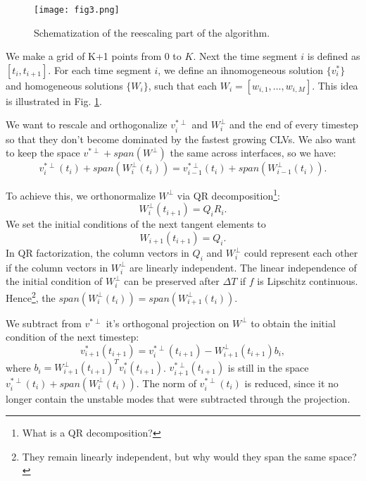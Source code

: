 \documentclass[10pt,twoside,a4paper]{article} %
\begin{document}
\begin{figure} %
  \begin{center}
    \texttt{[image: fig3.png]}
  \end{center}
  \caption{Schematization of the reescaling part of the algorithm.}
  \label{fig:3}
\end{figure}
We make a grid of K+1 points from 0 to $K$. Next the time segment $i$ is defined as $[t_i, t_{i+1}]$. For each time segment $i$, we define an ihnomogeneous solution $\{v_i^*\}$ and homogeneous solutions $\{W_i\}$, such that each $W_i = [w_{i,1},\ldots,w_{i,M}]$. This idea is illustrated in Fig. \ref{fig:3}.

We want to rescale and orthogonalize $v_i^{*\perp}$ and $W_i^\perp$ and the end of every timestep so that they don't become dominated by the fastest growing CLVs. We also want to keep the space $v^{*\perp} + span(W^\perp)$ the same across interfaces, so we have:
\begin{equation}
  v_i^{*\perp}(t_i) + span(W_{i}^\perp(t_i)) = v_{i-1}^{*\perp}(t_i) + span(W_{i-1}^\perp(t_i)).
  \label{eq:16}
\end{equation}

To achieve this, we orthonormalize $W^\perp$ via QR decomposition\footnote{What is a QR decomposition?}:
\begin{equation}
  W_i^\perp(t_{i+1}) = Q_i R_i.
  \label{eq:17}
\end{equation}
We set the initial conditions of the next tangent elements to
\begin{equation}
  W_{i+1}(t_{i+1}) = Q_i.
  \label{eq:18}
\end{equation}
In QR factorization, the column vectors in $Q_i$ and $W_i^\perp$ could represent each other if the column vectors in $W_i^\perp$ are linearly independent. The linear independence of the initial condition of $W_i^\perp$ can be preserved after $\Delta T$ if $f$ is Lipschitz continuous. Hence\footnote{They remain linearly independent, but why would they span the same space?}, the $span(W_i^\perp(t_i)) = span(W_{i+1}^\perp(t_{i}))$.

We subtract from $v^{*\perp}$ it's orthogonal projection on $W^\perp$ to obtain the initial condition of the next timestep:
\begin{equation}
  v^*_{i+1}(t_{i+1}) = v^{*\perp}_i (t_{i+1}) - W_{i+1}^\perp(t_{i+1})b_i,
  \label{eq:19}
\end{equation}
where $b_i = W_{i+1}^\perp(t_{i+1})^T v_i^*(t_{i+1})$. $v_{i+1}^{*\perp}(t_{i+1})$ is still in the space $v_i^{*\perp}(t_i) + span(W_i^\perp(t_i)).$ The norm of $v_i^{*\perp}(t_i)$ is reduced, since it no longer contain the unstable modes that were subtracted through the projection.
\end{document}
